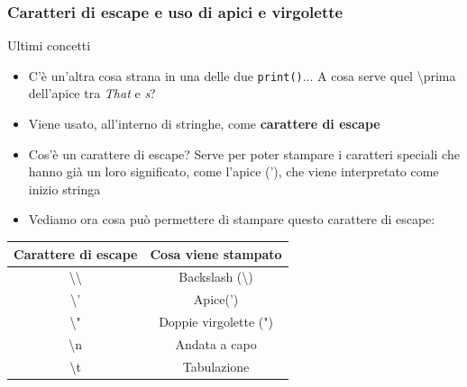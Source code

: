 \documentclass{beamer}
\begin{document}
\begin{frame}[fragile]
\frametitle{Caratteri di escape e uso di apici e virgolette}
\begin{block}{Ultimi concetti}
	\begin{itemize}
		\item C'è un'altra cosa strana in una delle due \texttt{print()}... A cosa serve quel \textbackslash prima dell'apice tra \textit{That} e \textit{s}?
		\item Viene usato, all'interno di stringhe, come \textbf{carattere di escape}
		\item Cos'è un carattere di escape? Serve per poter stampare i caratteri speciali che hanno già un loro significato, come l'apice ('), che viene interpretato come inizio stringa
		\item Vediamo ora cosa può permettere di stampare questo carattere di escape:
	\end{itemize}
\end{block}
\begin{center}
	\begin{tabular}{ c  c }
		\hline
		Carattere di escape & Cosa viene stampato \\ 
		\hline
		\textbackslash \textbackslash & Backslash (\textbackslash)  \\
		\textbackslash ' & Apice(') \\
		\textbackslash " & Doppie virgolette (")\\  
		\textbackslash n & Andata a capo\\
		\textbackslash t & Tabulazione 
	\end{tabular}
\end{center}
\end{frame}
\end{document}
